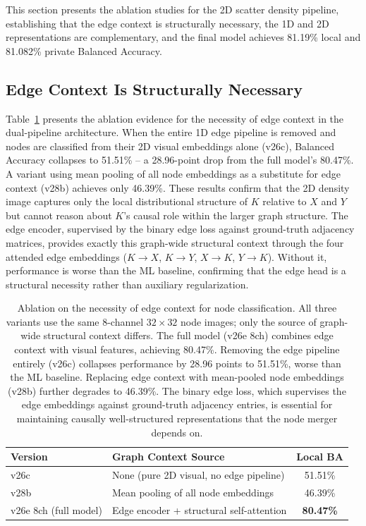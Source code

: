 This section presents the ablation studies for the 2D scatter density pipeline, establishing that the edge context is structurally necessary, the 1D and 2D representations are complementary, and the final model achieves 81.19\% local and 81.082\% private Balanced Accuracy.

\subsection{Edge Context Is Structurally Necessary}

Table~\ref{tab:edge_context_necessity} presents the ablation evidence for the necessity of edge context in the dual-pipeline architecture. When the entire 1D edge pipeline is removed and nodes are classified from their 2D visual embeddings alone (v26c), Balanced Accuracy collapses to 51.51\% -- a 28.96-point drop from the full model's 80.47\%. A variant using mean pooling of all node embeddings as a substitute for edge context (v28b) achieves only 46.39\%. These results confirm that the 2D density image captures only the local distributional structure of $K$ relative to $X$ and $Y$ but cannot reason about $K$'s causal role within the larger graph structure. The edge encoder, supervised by the binary edge loss against ground-truth adjacency matrices, provides exactly this graph-wide structural context through the four attended edge embeddings ($K \to X$, $K \to Y$, $X \to K$, $Y \to K$). Without it, performance is worse than the ML baseline, confirming that the edge head is a structural necessity rather than auxiliary regularization.

\begin{table}[ht]
	\centering
	\caption{Ablation on the necessity of edge context for node classification. All three variants use the same 8-channel $32\times32$ node images; only the source of graph-wide structural context differs. The full model (v26e 8ch) combines edge context with visual features, achieving 80.47\%. Removing the edge pipeline entirely (v26c) collapses performance by 28.96 points to 51.51\%, worse than the ML baseline. Replacing edge context with mean-pooled node embeddings (v28b) further degrades to 46.39\%. The binary edge loss, which supervises the edge embeddings against ground-truth adjacency entries, is essential for maintaining causally well-structured representations that the node merger depends on.}
	\label{tab:edge_context_necessity}
	\begin{tabular}{llc}
		\toprule
		\textbf{Version}            & \textbf{Graph Context Source}                    & \textbf{Local BA} \\
		\midrule
		v26c                        & None (pure 2D visual, no edge pipeline)        & 51.51\%           \\
		v28b                        & Mean pooling of all node embeddings              & 46.39\%           \\
		v26e 8ch (full model)       & Edge encoder + structural self-attention         & \textbf{80.47\%}  \\
		\bottomrule
	\end{tabular}
\end{table}

